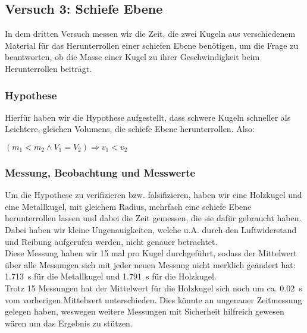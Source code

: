 \documentclass[11pt,a4paper,titlepage, ngerman]{article}
\begin{document}
		\vspace{1cm}
		\subsection{Versuch 3: Schiefe Ebene}
			\label{2.3}
			
			In dem dritten Versuch messen wir die Zeit, die zwei Kugeln aus verschiedenem Material für das Herunterrollen einer schiefen Ebene benötigen, um die Frage zu beantworten, ob die Masse einer Kugel zu ihrer Geschwindigkeit beim Herunterrollen beiträgt.	
					
			\subsubsection{Hypothese}
				\label{2.3.1}
				
				Hierfür haben wir die Hypothese aufgestellt, dass schwere Kugeln schneller als Leichtere, gleichen Volumens, die schiefe Ebene herunterrollen. Also: 
				\begin{center}
					$(m_1 < m_2 \wedge V_1 = V_2) \Rightarrow v_1 < v_2$
				\end{center}
					
			\subsubsection{Messung, Beobachtung und Messwerte}
				\label{2.3.2}
				
				Um die Hypothese zu verifizieren bzw. falsifizieren, haben wir eine Holzkugel und eine Metallkugel, mit gleichem Radius, mehrfach eine schiefe Ebene herunterrollen lassen und dabei die Zeit gemessen, die sie dafür gebraucht haben. \\
				Dabei haben wir kleine Ungenauigkeiten, welche u.A. durch den Luftwiderstand und Reibung aufgerufen werden, nicht genauer betrachtet. \\
				
				Diese Messung haben wir 15 mal pro Kugel durchgeführt, sodass der Mittelwert über alle Messungen sich mit jeder neuen Messung nicht merklich geändert hat: \SI{1.713}{\s} für die Metallkugel und \SI{1.791}{\s} für die Holzkugel. \\
								
				Trotz 15 Messungen hat der Mittelwert für die Holzkugel sich noch um ca. \SI{0.02}{s} vom vorherigen Mittelwert unterschieden. Dies könnte an ungenauer Zeitmessung gelegen haben, weswegen weitere Messungen mit Sicherheit hilfreich gewesen wären um das Ergebnis zu stützen. \\
				
\end{document}
